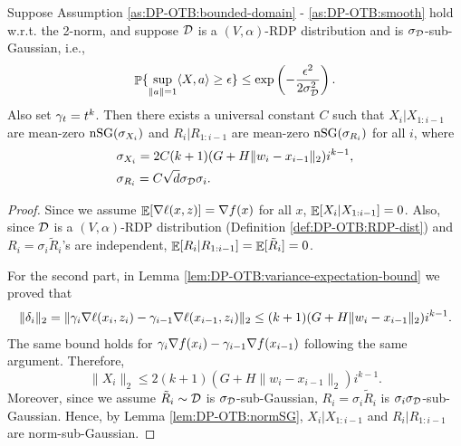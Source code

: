 \begin{lemma}
\label{lem:DP-OTB:X-R-nSG}
Suppose Assumption \ref{as:DP-OTB:bounded-domain} - \ref{as:DP-OTB:smooth} hold w.r.t. the 2-norm, and suppose ${\cal D}$ is a $(V,\alpha)$-RDP distribution and is $\sigma_{\cal D}$-sub-Gaussian, i.e.,
\begin{align*}
    \mathop{\mathbb{P}}\{\sup_{\|a\|=1} \langle X, a\rangle \geq \epsilon \} \leq \exp\left(- \frac{\epsilon^2}{2\sigma_{\cal D}^2}\right).
\end{align*}
Also set $\gamma_t=t^k$. Then there exists a universal constant $C$ such that $X_i|X_{1:i-1}$ are mean-zero $\mathrm{nSG}(\sigma_{X_i})$ and $R_i|R_{1:i-1}$ are mean-zero $\mathrm{nSG}(\sigma_{R_i})$ for all $i$, where
\begin{align*}
    & \sigma_{X_i} = 2C(k+1)(G+H\|w_i-x_{i-1}\|_2)i^{k-1}, \\
    & \sigma_{R_i} = C\sqrt{d}\sigma_{\cal D} \sigma_i.
\end{align*}
\end{lemma}

\begin{proof}
Since we assume $\mathop{\mathbb{E}}[\nabla\ell(x,z)]=\nabla f(x)$ for all $x$, $\mathop{\mathbb{E}}[X_i|X_{1:i-1}]=0$. Also, since ${\cal D}$ is a $(V,\alpha)$-RDP distribution (Definition \ref{def:DP-OTB:RDP-dist}) and $R_i=\sigma_i\tilde R_i$'s are independent, $\mathop{\mathbb{E}}[R_i|R_{1:i-1}]=\mathop{\mathbb{E}}[\tilde R_i]=0$. 

For the second part, in Lemma \ref{lem:DP-OTB:variance-expectation-bound} we proved that
\begin{align*}
    \|\delta_i\|_2 = \|\gamma_i\nabla\ell(x_i,z_i)-\gamma_{i-1}\nabla\ell(x_{i-1},z_i)\|_2 \leq (k+1)(G+H\|w_i-x_{i-1}\|_2)i^{k-1}.
\end{align*}
The same bound holds for $\gamma_i\nabla f(x_i)-\gamma_{i-1}\nabla f(x_{i-1})$ following the same argument. Therefore,
\[
\|X_i\|_2 \leq 2(k+1)(G+H\|w_i-x_{i-1}\|_2)i^{k-1}.
\]
Moreover, since we assume $\tilde R_i\sim {\cal D}$ is $\sigma_{\cal D}$-sub-Gaussian, $R_i=\sigma_i\tilde R_i$ is $\sigma_i\sigma_{\cal D}$-sub-Gaussian.
Hence, by Lemma \ref{lem:DP-OTB:normSG}, $X_i|X_{1:i-1}$ and $R_i|R_{1:i-1}$ are norm-sub-Gaussian.
\end{proof}


